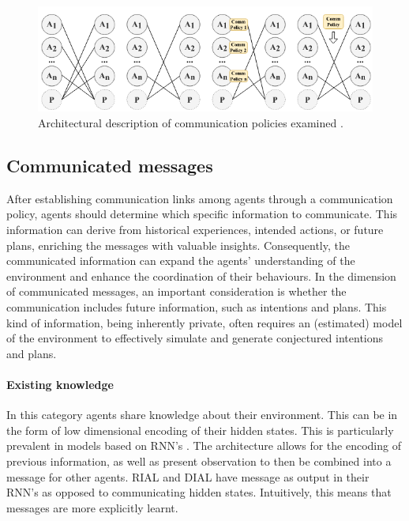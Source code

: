 \documentclass{article}
\begin{document}
\begin{figure}
	\centering
	\includegraphics[scale=0.5]{images/communication_policies.png}
	\caption{Architectural description of communication policies examined \citet{zhu2024survey}. }
	\label{fig:communication_policies}
\end{figure}

\subsection{Communicated messages}

After establishing communication links among agents through a communication policy, agents should determine which specific information to communicate. This information can derive from historical experiences, intended actions, or future plans, enriching the messages with valuable insights. Consequently, the communicated information can expand the agents’ understanding of the environment and enhance the coordination of their behaviours. In the dimension of communicated messages, an important consideration is whether the communication includes future information, such as intentions and plans. This kind of information, being inherently private, often requires an (estimated) model of the environment to effectively simulate and generate conjectured intentions and plans.

\paragraph{Existing knowledge} In this category agents share knowledge about their environment. This can be in the form of low dimensional encoding of their hidden states. This is particularly prevalent in models based on RNN's \citep{sukhbaatar2016commnet, peng2017bicnet, singh2018ic3net}. The architecture allows for the encoding of previous information, as well as present observation to then be combined into a message for other agents. RIAL and DIAL \citep{foerster2016learning} have message as output in their RNN's as opposed to communicating hidden states. Intuitively, this means that messages are more explicitly learnt.
\end{document}
